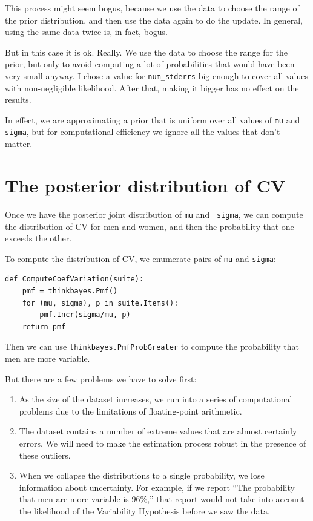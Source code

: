 \documentclass[12pt]{book}
\begin{document}
This process might seem bogus, because we use the data to choose the
range of the prior distribution, and then use the data again to do the
update.  In general, using the same data twice is, in fact, bogus.

But in this case it is ok.  Really.  We use the data to choose the
range for the prior, but only to avoid computing a lot of
probabilities that would have been very small anyway.  I chose a value
for \verb"num_stderrs" big enough to cover all values with
non-negligible likelihood.  After that, making it bigger has no effect
on the results.

In effect, we are approximating a prior that is uniform over all values 
of {\tt mu} and {\tt sigma}, but for computational efficiency
we ignore all the values that don't matter.

\section{The posterior distribution of CV}

Once we have the posterior joint distribution of {\tt mu} and {\tt
  sigma}, we can compute the distribution of CV for men and women, and
then the probability that one exceeds the other.

To compute the distribution of CV, we enumerate pairs of
{\tt mu} and {\tt sigma}:

\begin{verbatim}
def ComputeCoefVariation(suite):
    pmf = thinkbayes.Pmf()
    for (mu, sigma), p in suite.Items():
        pmf.Incr(sigma/mu, p)
    return pmf
\end{verbatim}

Then we can use \verb"thinkbayes.PmfProbGreater" to compute the
probability that men are more variable.

But there are a few problems we have to solve first:

\begin{enumerate}

\item As the size of the dataset increases, we run into a series of
  computational problems due to the limitations of floating-point
  arithmetic.

\item The dataset contains a number of extreme values that are almost
  certainly errors.  We will need to make the estimation process
  robust in the presence of these outliers.

\item When we collapse the distributions to a single probability, we
  lose information about uncertainty.  For example, if we report ``The
  probability that men are more variable is 96\%,'' that report would
  not take into account the likelihood of the Variability Hypothesis
  before we saw the data.

\end{enumerate}
\end{document}
